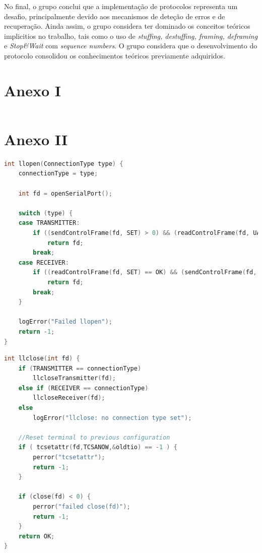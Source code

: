 \documentclass[a4paper, 11pt]{article}
\begin{document}
No final, o grupo conclui que a implementação de protocolos representa um desafio, principalmente devido aos mecanismos de deteção de erros e de recuperação. Ainda assim, o grupo considera ter dominado os conceitos teóricos implicitios no trabalho, tais como o uso de \textit{stuffing, destuffing, framing, deframing} e \textit{Stop\&Wait} com \textit{sequence numbers}. O grupo considera que o desenvolvimento do protocolo consolidou os conhecimentos teóricos previamente adquiridos.

\newpage

\section{Anexo I}
\begin{lstlisting}[language=C]


\end{lstlisting}

\newpage

\section{Anexo II}

\begin{lstlisting}[caption = llopen, language=C]
int llopen(ConnectionType type) {
	connectionType = type;

	int fd = openSerialPort();

	switch (type) {
	case TRANSMITTER:
		if ((sendControlFrame(fd, SET) > 0) && (readControlFrame(fd, UA) == OK))
			return fd;
		break;
	case RECEIVER:
		if ((readControlFrame(fd, SET) == OK) && (sendControlFrame(fd, UA) > 0))
			return fd;
		break;
	}

	logError("Failed llopen");
	return -1;
}
\end{lstlisting}


\begin{lstlisting}[caption = llclose, language=C]
int llclose(int fd) {
	if (TRANSMITTER == connectionType)
		llcloseTransmitter(fd);
	else if (RECEIVER == connectionType)
		llcloseReceiver(fd);
	else
		logError("llclose: no connection type set");

	//Reset terminal to previous configuration
	if ( tcsetattr(fd,TCSANOW,&oldtio) == -1 ) {
		perror("tcsetattr");
		return -1;
	}

	if (close(fd) < 0) {
		perror("failed close(fd)");
		return -1;
	}
	return OK;
}
\end{lstlisting}
\end{document}
